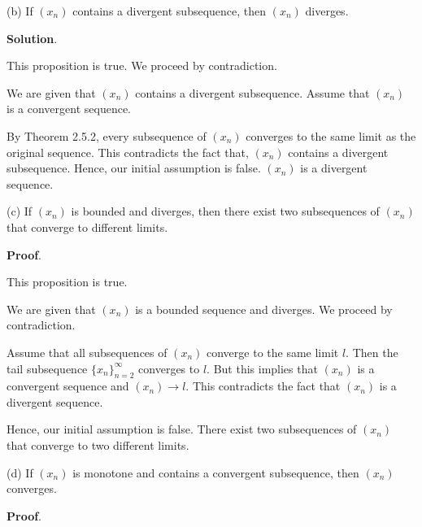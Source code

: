 \documentclass[10pt]{article}
\begin{document}
(b) If $\displaystyle ( x_{n})$ contains a divergent subsequence, then $\displaystyle ( x_{n})$ diverges.



\textbf{Solution}.



This proposition is true. We proceed by contradiction. 



We are given that $\displaystyle ( x_{n})$ contains a divergent subsequence. Assume that $\displaystyle ( x_{n})$ is a convergent sequence. 



By Theorem 2.5.2, every subsequence of $\displaystyle ( x_{n})$ converges to the same limit as the original sequence. This contradicts the fact that, $\displaystyle ( x_{n})$ contains a divergent subsequence. Hence, our initial assumption is false. $\displaystyle ( x_{n})$ is a divergent sequence.



(c) If $\displaystyle ( x_{n})$ is bounded and diverges, then there exist two subsequences of $\displaystyle ( x_{n})$ that converge to different limits. 



\textbf{Proof}.



This proposition is true.



We are given that $\displaystyle ( x_{n})$ is a bounded sequence and diverges. We proceed by contradiction.



Assume that all subsequences of $\displaystyle ( x_{n})$ converge to the same limit $\displaystyle l$. Then the tail subsequence $\displaystyle \{x_{n}\}_{n=2}^{\infty }$ converges to $\displaystyle l$. But this implies that $\displaystyle ( x_{n})$ is a convergent sequence and $\displaystyle ( x_{n})\rightarrow l$. This contradicts the fact that $\displaystyle ( x_{n})$ is a divergent sequence. 



Hence, our initial assumption is false. There exist two subsequences of $\displaystyle ( x_{n})$ that converge to two different limits. 



(d) If $\displaystyle ( x_{n})$ is monotone and contains a convergent subsequence, then $\displaystyle ( x_{n})$ converges.



\textbf{Proof}.
\end{document}
